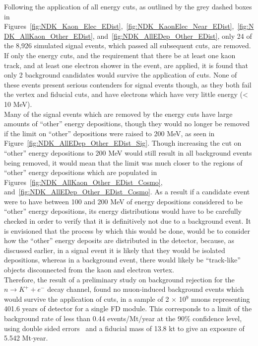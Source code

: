 Following the application of all energy cuts, as outlined by the grey dashed boxes in Figures~\ref{fig:NDK_Kaon_Elec_EDist},~\ref{fig:NDK_KaonElec_Near_EDist},~\ref{fig:NDK_AllKaon_Other_EDist}, and~\ref{fig:NDK_AllEDep_Other_EDist}, only 24 of the 8,926 simulated signal events, which passed all subsequent cuts, are removed. If only the energy cuts, and the requirement that there be at least one kaon track, and at least one electron shower in the event, are applied, it is found that only 2 background candidates would survive the application of cuts. None of these events present serious contenders for signal events though, as they both fail the vertex and fiducial cuts, and have electrons which have very little energy (< 10 MeV). \\

Many of the signal events which are removed by the energy cuts have large amounts of ``other'' energy depositions, though they would no longer be removed if the limit on ``other'' depositions were raised to 200 MeV, as seen in Figure~\ref{fig:NDK_AllEDep_Other_EDist_Sig}. Though increasing the cut on ``other'' energy depositions to 200 MeV would still result in all background events being removed, it would mean that the limit was much closer to the regions of ``other'' energy depositions which are populated in Figures~\ref{fig:NDK_AllKaon_Other_EDist_Cosmo}, and~\ref{fig:NDK_AllEDep_Other_EDist_Cosmo}. As a result if a candidate event were to have between 100 and 200 MeV of energy depositions considered to be ``other'' energy depositions, its energy distributions would have to be carefully checked in order to verify that it is definitively not due to a background event. It is envisioned that the process by which this would be done, would be to consider how the ``other'' energy deposits are distributed in the detector, because, as discussed earlier, in a signal event it is likely that they would be isolated depositions, whereas in a background event, there would likely be ``track-like'' objects disconnected from the kaon and electron vertex. \\

Therefore, the result of a preliminary study on background rejection for the $n \rightarrow K^{+} + e^{-}$ decay channel, found no muon-induced background events which would survive the application of cuts, in a sample of 2 $\times$ 10$^9$ muons representing 401.6 years of detector for a single FD module. This corresponds to a limit of the background rate of less than 0.44 events/Mt/year at the 90\% confidence level, using double sided errors~\citep{PDGReview} and a fiducial mass of 13.8 kt to give an exposure of 5.542 Mt$\cdot$year. \\

